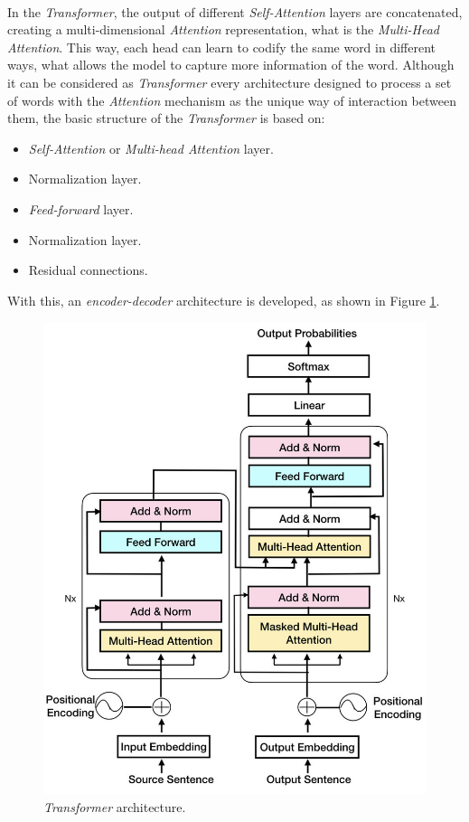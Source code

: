 \paragraph{}
In the \emph{Transformer}, the output of different \emph{Self-Attention} layers are concatenated, creating a multi-dimensional \emph{Attention} representation, what is the \emph{Multi-Head Attention}. This way, each head can learn to codify the same word in different ways, what allows the model to capture more information of the word. Although it can be considered as \emph{Transformer} every architecture designed to process a set of words with the \emph{Attention} mechanism as the unique way of interaction between them, the basic structure of the \emph{Transformer} is based on:
\begin{itemize}
\item \emph{Self-Attention} or \emph{Multi-head Attention} layer.
\item Normalization layer.
\item \emph{Feed-forward} layer.
\item Normalization layer.
\item Residual connections.
\end{itemize}
With this, an \emph{encoder-decoder} architecture is developed, as shown in Figure \ref{fig:transformer}.
\begin{figure}[h!]
	\centering
	\includegraphics[scale=0.25]{images/transformer}
	\caption{\emph{Transformer} architecture.}
	\label{fig:transformer}
\end{figure}
